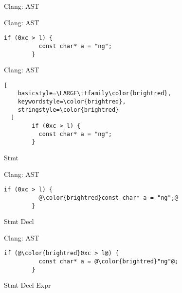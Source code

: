 
\begin{frame}[fragile]{Clang: AST}
\end{frame}

\begin{frame}[fragile]{Clang: AST}
  \vs{0.6cm}
  \begin{lstlisting}[basicstyle=\LARGE\ttfamily]
        if (0xc > l) {
          const char* a = "ng";
        }
  \end{lstlisting}

  \vs{0.2cm}
  \begin{center}
    \ttfamily\LARGE
    \phantom{Stmt Decl Expr Type} %
  \end{center}
\end{frame}

\begin{frame}[fragile]{Clang: AST}
  \vs{0.2cm}
  \begin{lstlisting}[
    basicstyle=\LARGE\ttfamily\color{brightred},
    keywordstyle=\color{brightred},
    stringstyle=\color{brightred}
  ]
        if (0xc > l) {
          const char* a = "ng";
        }
  \end{lstlisting}

  \vs{0.2cm}
  \begin{center}
    \ttfamily\LARGE
    \color{brightred}Stmt\hs{0.2cm}
    \phantom{Decl Expr Type} %
  \end{center}
\end{frame}

\begin{frame}[fragile]{Clang: AST}
  \vs{0.2cm}
  \begin{lstlisting}[basicstyle=\LARGE\ttfamily]
        if (0xc > l) {
          @\color{brightred}const char* a = "ng";@
        }
  \end{lstlisting}

  \vs{0.2cm}
  \begin{center}
    \ttfamily\LARGE
    Stmt\hs{0.2cm}
    \color{brightred}Decl\hs{0.2cm}
    \phantom{Expr Type} %
  \end{center}

\end{frame}

\begin{frame}[fragile]{Clang: AST}
  \vs{0.2cm}
  \begin{lstlisting}[basicstyle=\LARGE\ttfamily]
        if (@\color{brightred}0xc > l@) {
          const char* a = @\color{brightred}"ng"@;
        }
  \end{lstlisting}

  \vs{0.2cm}
  \begin{center}
    \ttfamily\LARGE
    Stmt\hs{0.2cm}
    Decl\hs{0.2cm}
    \color{brightred}Expr\hs{0.2cm}
    \phantom{Type} %
  \end{center}

\end{frame}

